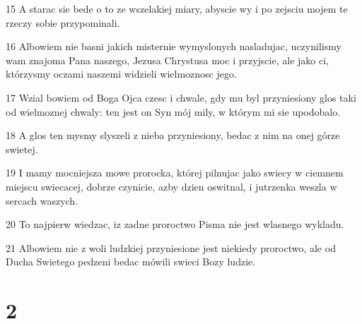 \par 15 A starac sie bede o to ze wszelakiej miary, abyscie wy i po zejsciu mojem te rzeczy sobie przypominali.
\par 16 Albowiem nie basni jakich misternie wymyslonych nasladujac, uczynilismy wam znajoma Pana naszego, Jezusa Chrystusa moc i przyjscie, ale jako ci, którzysmy oczami naszemi widzieli wielmoznosc jego.
\par 17 Wzial bowiem od Boga Ojca czesc i chwale, gdy mu byl przyniesiony glos taki od wielmoznej chwaly: ten jest on Syn mój mily, w którym mi sie upodobalo.
\par 18 A glos ten mysmy slyszeli z nieba przyniesiony, bedac z nim na onej górze swietej.
\par 19 I mamy mocniejsza mowe prorocka, której pilnujac jako swiecy w ciemnem miejscu swiecacej, dobrze czynicie, azby dzien oswitnal, i jutrzenka weszla w sercach waszych.
\par 20 To najpierw wiedzac, iz zadne proroctwo Pisma nie jest wlasnego wykladu.
\par 21 Albowiem nie z woli ludzkiej przyniesione jest niekiedy proroctwo, ale od Ducha Swietego pedzeni bedac mówili swieci Bozy ludzie.

\chapter{2}

